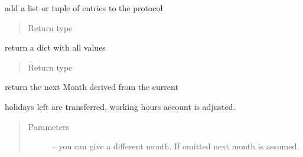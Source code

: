 \documentclass[letterpaper,10pt,english]{sphinxmanual}
\begin{document}
\begin{fulllineitems}
\begin{fulllineitems}
\end{fulllineitems}


\begin{fulllineitems}
\label{\detokenize{devmanual:protocol.Month.append_protocol}}
add a list or tuple of entries to the protocol
\begin{quote}\begin{description}
\item[{Return type}] \leavevmode
{\hyperref[\detokenize{devmanual:protocol.Month}]{}}

\end{description}\end{quote}

\end{fulllineitems}


\begin{fulllineitems}
\label{\detokenize{devmanual:protocol.Month.dump}}
return a dict with all values
\begin{quote}\begin{description}
\item[{Return type}] \leavevmode
{}

\end{description}\end{quote}

\end{fulllineitems}


\begin{fulllineitems}
\label{\detokenize{devmanual:protocol.Month.get_next}}
return the next Month derived from the current

holidays left are transferred, working hours account
is adjusted.
\begin{quote}\begin{description}
\item[{Parameters}] \leavevmode
{} -- you can give a different month. If omitted next
month is assumed.


\end{description}
\end{quote}
\end{fulllineitems}
\end{fulllineitems}
\end{document}
